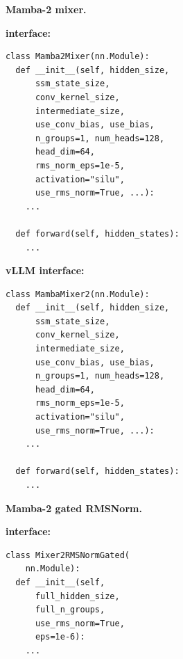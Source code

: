\begin{figure}[tbp]
\noindent\textbf{Mamba-2 mixer.}

\noindent
\begin{minipage}[t]{0.48\linewidth}
\vspace{0pt}
\textbf{\FastKernels interface:}
\begin{lstlisting}[basicstyle=\ttfamily\scriptsize,columns=fullflexible,keepspaces=true,breaklines=true,showstringspaces=false,frame=single,aboveskip=2pt,belowskip=2pt]
class Mamba2Mixer(nn.Module):
  def __init__(self, hidden_size,
      ssm_state_size,
      conv_kernel_size,
      intermediate_size,
      use_conv_bias, use_bias,
      n_groups=1, num_heads=128,
      head_dim=64,
      rms_norm_eps=1e-5,
      activation="silu",
      use_rms_norm=True, ...):
    ...

  def forward(self, hidden_states):
    ...
\end{lstlisting}
\end{minipage}
\hfill
\begin{minipage}[t]{0.48\linewidth}
\vspace{0pt}
\textbf{vLLM interface:}
\begin{lstlisting}[basicstyle=\ttfamily\scriptsize,columns=fullflexible,keepspaces=true,breaklines=true,showstringspaces=false,frame=single,aboveskip=2pt,belowskip=2pt]
class MambaMixer2(nn.Module):
  def __init__(self, hidden_size,
      ssm_state_size,
      conv_kernel_size,
      intermediate_size,
      use_conv_bias, use_bias,
      n_groups=1, num_heads=128,
      head_dim=64,
      rms_norm_eps=1e-5,
      activation="silu",
      use_rms_norm=True, ...):
    ...

  def forward(self, hidden_states):
    ...
\end{lstlisting}
\end{minipage}

\medskip

\noindent\textbf{Mamba-2 gated RMSNorm.}

\noindent
\begin{minipage}[t]{0.48\linewidth}
\vspace{0pt}
\textbf{\FastKernels interface:}
\begin{lstlisting}[basicstyle=\ttfamily\scriptsize,columns=fullflexible,keepspaces=true,breaklines=true,showstringspaces=false,frame=single,aboveskip=2pt,belowskip=2pt]
class Mixer2RMSNormGated(
    nn.Module):
  def __init__(self,
      full_hidden_size,
      full_n_groups,
      use_rms_norm=True,
      eps=1e-6):
    ...


\end{lstlisting}
\end{minipage}
\end{figure}
